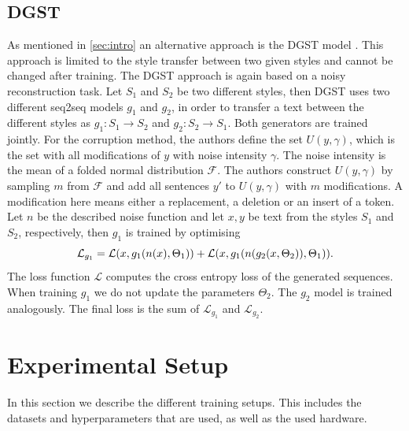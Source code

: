 \documentclass[twocolumn]{tum-article}
\begin{document}
\subsection{DGST}\label{sec:dgst}
As mentioned in \autoref{sec:intro} an alternative approach is the DGST model \cite{li2020dgst}. This approach is limited to the style transfer between two given styles and cannot be changed after training. The DGST approach is again based on a noisy reconstruction task. Let $S_1$ and $S_2$ be two different styles, then DGST uses two different seq2seq models $g_1$ and $g_2$, in order to transfer a text between the different styles as $g_1: S_1 \rightarrow S_2$ and $g_2: S_2 \rightarrow S_1$. Both generators are trained jointly. For the corruption method, the authors define the set $U(y, \gamma)$, which is the set with all modifications of $y$ with noise intensity $\gamma$. The noise intensity is the mean of a folded normal distribution $\mathcal{F}$. The authors construct $U(y, \gamma)$ by sampling $m$ from $\mathcal{F}$ and add all sentences $y'$ to $U(y, \gamma)$ with $m$ modifications. A modification here means either a replacement, a deletion or an insert of a token. Let $n$ be the described noise function and let $x, y$ be text from the styles $S_1$ and $S_2$, respectively, then $g_1$ is trained by optimising 
$$
\mathcal{L}_{g_1} = \mathcal{L}(x, g_1(n(x), \Theta_1)) + \mathcal{L}(x, g_1(n(g_2(x, \Theta_2)), \Theta_1))\textnormal{.}
$$
The loss function $\mathcal{L}$ computes the cross entropy loss of the generated sequences. When training $g_1$ we do not update the parameters $\Theta_2$. The $g_2$ model is trained analogously. The final loss is the sum of $\mathcal{L}_{g_1}$ and $\mathcal{L}_{g_2}$.
\section{Experimental Setup}\label{sec:experiment_setup}
In this section we describe the different training setups. This includes the datasets and hyperparameters that are used, as well as the used hardware.
\end{document}
